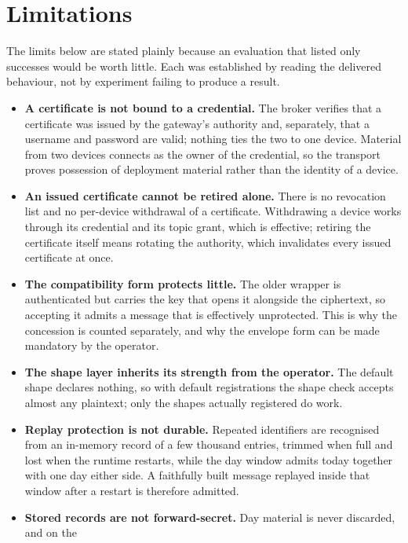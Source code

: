 \documentclass[12pt,a4paper]{report}
\begin{document}
\section{Limitations}
\label{sec:eval-resources}
The limits below are stated plainly because an evaluation
that listed only successes would be worth little. Each was
established by reading the delivered behaviour, not by
experiment failing to produce a result.

\begin{itemize}
    \item \textbf{A certificate is not bound to a credential.}
    The broker verifies that a certificate was issued by the
    gateway's authority and, separately, that a username and
    password are valid; nothing ties the two to one device.
    Material from two devices connects as the owner of the
    credential, so the transport proves possession of
    deployment material rather than the identity of a device.
    \item \textbf{An issued certificate cannot be retired
    alone.} There is no revocation list and no per-device
    withdrawal of a certificate. Withdrawing a device works
    through its credential and its topic grant, which is
    effective; retiring the certificate itself means rotating
    the authority, which invalidates every issued
    certificate at once.
    \item \textbf{The compatibility form protects little.}
    The older wrapper is authenticated but carries the key
    that opens it alongside the ciphertext, so accepting it
    admits a message that is effectively unprotected. This is
    why the concession is counted separately, and why the
    envelope form can be made mandatory by the operator.
    \item \textbf{The shape layer inherits its strength from
    the operator.} The default shape declares nothing, so
    with default registrations the shape check accepts almost
    any plaintext; only the shapes actually registered do
    work.
    \item \textbf{Replay protection is not durable.} Repeated
    identifiers are recognised from an in-memory record of a
    few thousand entries, trimmed when full and lost when the
    runtime restarts, while the day window admits today
    together with one day either side. A faithfully built
    message replayed inside that window after a restart is
    therefore admitted.
    \item \textbf{Stored records are not forward-secret.}
    Day material is never discarded, and on the

\end{itemize}
\end{document}
